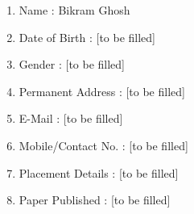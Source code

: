 \documentclass[oneside,a4paper,12pt]{report}
\begin{document}
\begin{appendices}
\begin{enumerate}
\end{enumerate}
\newpage
\begin{enumerate}
\item Name : Bikram Ghosh \hspace{62 mm}\fbox{\parbox[c][75pt][c]{60pt}{\centering\scriptsize [Photo]}}
\item Date of Birth : [to be filled]
\item Gender : [to be filled]
\item Permanent Address : [to be filled]
\item E-Mail : [to be filled]
\item Mobile/Contact No. : [to be filled]
\item Placement Details : [to be filled]
\item Paper Published : [to be filled]

\end{enumerate}
\end{appendices}
\end{document}
